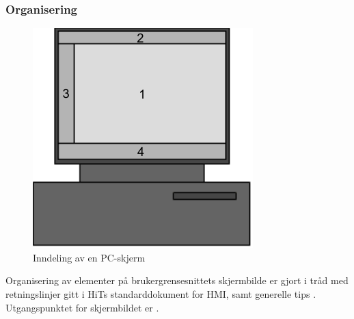 \documentclass[Visionprosjekt.tex]{subfiles}
\begin{document}




%
%
%



\subsubsection{Organisering}

\begin{figure}
	\centering
    \vspace{-10pt}
		\includegraphics[scale=0.8]{bilder/skjermomraader.pdf}
	\caption{Inndeling av en PC-skjerm }
	\label{fig:skjermomraader}
\end{figure}
Organisering av elementer på brukergrensesnittets skjermbilde er gjort i tråd med retningslinjer gitt i HiTs standarddokument for HMI, samt generelle tips  \cite{HMIstandard,HMIMorten}. Utgangspunktet for skjermbildet er   \cite{HMIstandard}.

\end{document}
